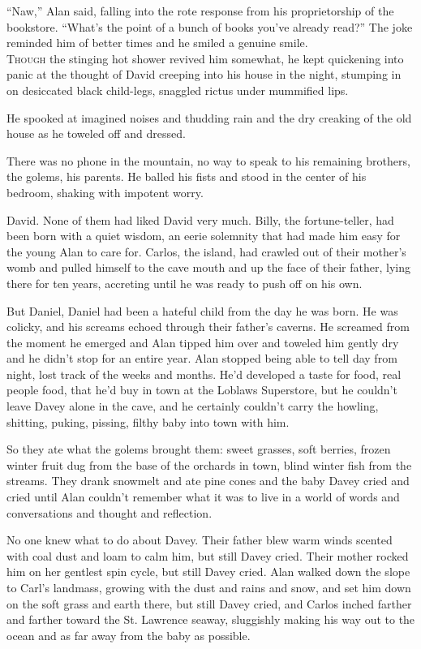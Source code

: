 \documentclass{article}
\begin{document}
``Naw,'' Alan said, falling into the rote response from his
proprietorship of the bookstore.  ``What's the point of a bunch of
books you've already read?'' The joke reminded him of better times and
he smiled a genuine smile.
\\
\lettrine[lines=3, lhang=.5, nindent=0pt, findent=2pt]{T}{hough} the stinging hot shower revived him somewhat, he kept
quickening into panic at the thought of David creeping into his house
in the night, stumping in on desiccated black child-legs, snaggled
rictus under mummified lips.

He spooked at imagined noises and thudding rain and the dry creaking
of the old house as he toweled off and dressed.

There was no phone in the mountain, no way to speak to his remaining
brothers, the golems, his parents.  He balled his fists and stood in
the center of his bedroom, shaking with impotent worry.

David.  None of them had liked David very much.  Billy, the
fortune-teller, had been born with a quiet wisdom, an eerie solemnity
that had made him easy for the young Alan to care for.  Carlos, the
island, had crawled out of their mother's womb and pulled himself to
the cave mouth and up the face of their father, lying there for ten
years, accreting until he was ready to push off on his own.

But Daniel, Daniel had been a hateful child from the day he was born. 
He was colicky, and his screams echoed through their father's caverns. 
He screamed from the moment he emerged and Alan tipped him over and
toweled him gently dry and he didn't stop for an entire year.  Alan
stopped being able to tell day from night, lost track of the weeks and
months.  He'd developed a taste for food, real people food, that he'd
buy in town at the Loblaws Superstore, but he couldn't leave Davey
alone in the cave, and he certainly couldn't carry the howling,
shitting, puking, pissing, filthy baby into town with him.

So they ate what the golems brought them:  sweet grasses, soft
berries, frozen winter fruit dug from the base of the orchards in
town, blind winter fish from the streams.  They drank snowmelt and ate
pine cones and the baby Davey cried and cried until Alan couldn't
remember what it was to live in a world of words and conversations and
thought and reflection.

No one knew what to do about Davey.  Their father blew warm winds
scented with coal dust and loam to calm him, but still Davey cried. 
Their mother rocked him on her gentlest spin cycle, but still Davey
cried.  Alan walked down the slope to Carl's landmass, growing with
the dust and rains and snow, and set him down on the soft grass and
earth there, but still Davey cried, and Carlos inched farther and
farther toward the St.  Lawrence seaway, sluggishly making his way out
to the ocean and as far away from the baby as possible.
\end{document}
